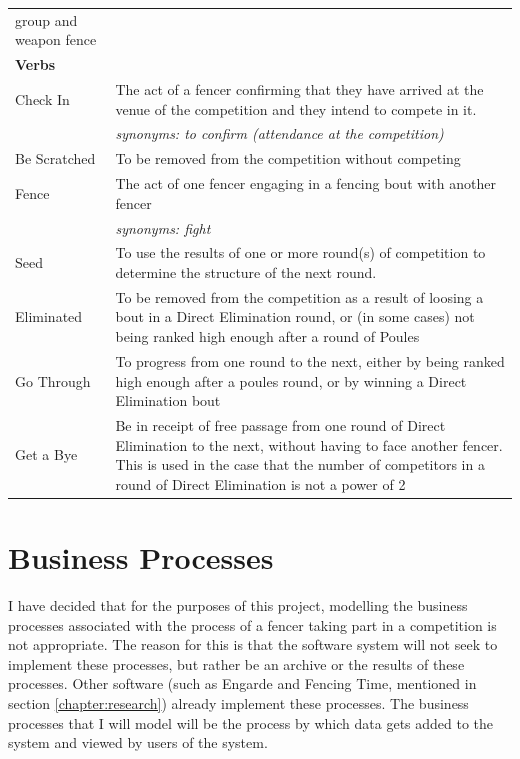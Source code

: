 \begin{center}
\begin{longtable}[l]{| p{} | p{} |}
 group and weapon fence \\
 \textbf{Verbs} & \\
 Check In & The act of a fencer confirming that they have arrived at the venue
 of the competition and they intend to compete in it. \\
 & \textit{synonyms: to confirm (attendance at the competition)} \\
 Be Scratched & To be removed from the competition without competing \\
 Fence & The act of one fencer engaging in a fencing bout with another fencer \\
 & \textit{synonyms: fight} \\
 Seed & To use the results of one or more round(s) of competition to determine
 the structure of the next round. \\
 Eliminated & To be removed from the competition as a result of loosing a bout
 in a Direct Elimination round, or (in some cases) not being ranked high enough
 after a round of Poules \\
 Go Through & To progress from one round to the next, either by being ranked
 high enough after a poules round, or by winning a Direct Elimination bout \\
 Get a Bye & Be in receipt of free passage from one round of Direct
 Elimination to the next, without having to face another fencer. This is used in
 the case that the number of competitors in a round of Direct Elimination is not
 a power of 2 \\
 \hline
\end{longtable}
\end{center}
\section{Business Processes} \label{section:businessProcesses}
I have decided that for the purposes of this project, modelling the business
processes associated with the process of a fencer taking part in a competition
is not appropriate. The reason for this is that the software system will not
seek to implement these processes, but rather be an archive or the results of
these processes. Other software (such as Engarde and Fencing Time, mentioned in
section \vref{chapter:research}) already implement these processes. The
business processes that I will model will be the process by which data gets
added to the system and viewed by users of the system.
